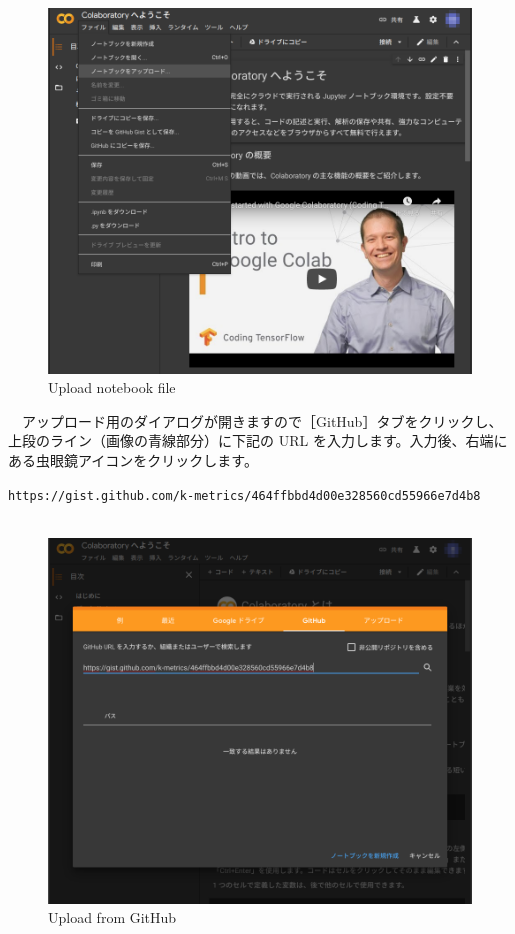 \documentclass[
  12pt,
]{book}
\begin{document}
\begin{figure}[H]

{\centering \includegraphics[width=0.8\linewidth,]{fig/Colab/upload_notebook} 

}

\caption{Upload notebook file}\label{fig:unnamed-chunk-78}
\end{figure}

　アップロード用のダイアログが開きますので［GitHub］タブをクリックし、上段のライン（画像の青線部分）に下記の URL を入力します。入力後、右端にある虫眼鏡アイコンをクリックします。

\texttt{https://gist.github.com/k-metrics/464ffbbd4d00e328560cd55966e7d4b8}~\\
　

\begin{figure}[H]

{\centering \includegraphics[width=0.8\linewidth,]{fig/Colab/upload_dialog} 

}

\caption{Upload from GitHub}\label{fig:unnamed-chunk-79}
\end{figure}
\end{document}
